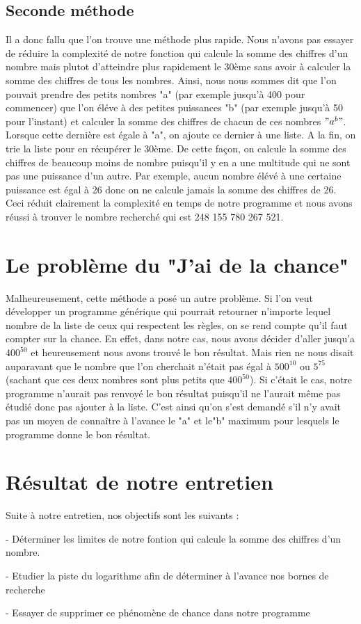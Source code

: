\documentclass{article}
\begin{document}
\subsection{Seconde méthode}

Il a donc fallu que l'on trouve une méthode plus rapide. Nous n'avons pas essayer de réduire la complexité de notre fonction qui calcule la somme des chiffres d'un nombre mais plutot d'atteindre plus rapidement le 30ème sans avoir à calculer la somme des chiffres de tous les nombres. Ainsi, nous nous sommes dit que l'on pouvait prendre des petits nombres "a" (par exemple jusqu'à 400 pour commencer) que l'on éléve à des petites puissances "b" (par exemple jusqu'à 50 pour l'instant) et calculer la somme des chiffres de chacun de ces nombres $"a^{b}"$. Lorsque cette dernière est égale à "a", on ajoute ce dernier à une liste. A la fin, on trie la liste pour en récupérer le 30ème. De cette façon, on calcule la somme des chiffres de beaucoup moins de nombre puisqu'il y en a une multitude qui ne sont pas une puissance d'un autre. Par exemple, aucun nombre élévé à une certaine puissance est égal à 26 donc on ne calcule jamais la somme des chiffres de 26. Ceci réduit clairement la complexité en temps de notre programme et nous avons réussi à trouver le nombre recherché qui est 248 155 780 267 521. 

\section{Le problème du "J'ai de la chance"}
Malheureusement, cette méthode a posé un autre problème. Si l'on veut développer un programme générique qui pourrait retourner n'importe lequel nombre de la liste de ceux qui respectent les règles, on se rend compte qu'il faut compter sur la chance. En effet, dans notre cas, nous avons décider d'aller jusqu'a $400^{50}$ et heureusement nous avons trouvé le bon résultat. Mais rien ne nous disait auparavant que le nombre que l'on cherchait n'était pas égal à $500^{10}$ ou $5^{75}$ (sachant que ces deux nombres sont plus petits que $400^{50}$). Si c'était le cas, notre programme n'aurait pas renvoyé le bon résultat puisqu'il ne l'aurait même pas étudié donc pas ajouter à la liste. C'est ainsi qu'on s'est demandé s'il n'y avait pas un moyen de connaître à l'avance le "a" et le"b" maximum pour lesquels le programme donne le bon résultat. 

\section{Résultat de notre entretien}
Suite à notre entretien, nos objectifs sont les suivants : 

- Déterminer les limites de notre fontion qui calcule la somme des chiffres d'un nombre.

- Etudier la piste du logarithme afin de déterminer à l'avance nos bornes de recherche

- Essayer de supprimer ce phénomène de chance dans notre programme
\end{document}
